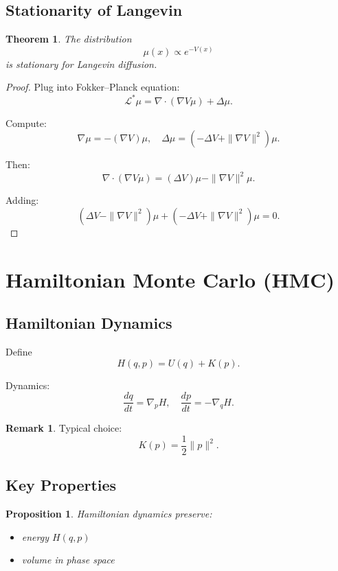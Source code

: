 \documentclass[12pt,oneside]{book}
\numberwithin{equation}{section}
\theoremstyle{definition}
\newtheorem{remark}{Remark}[section]
\theoremstyle{plain}
\newtheorem{theorem}{Theorem}[section]
\newtheorem{proposition}{Proposition}[section]
\theoremstyle{remark}
\begin{document}
\subsection*{Stationarity of Langevin}

\begin{theorem}
The distribution
\[
\mu(x) \propto e^{-V(x)}
\]
is stationary for Langevin diffusion.
\end{theorem}

\begin{proof}
Plug into Fokker--Planck equation:
\[
\mathcal{L}^*\mu
=
\nabla \cdot (\nabla V \mu) + \Delta \mu.
\]

Compute:
\[
\nabla \mu = -(\nabla V)\mu,
\quad
\Delta \mu = (-\Delta V + \|\nabla V\|^2)\mu.
\]

Then:
\[
\nabla \cdot (\nabla V \mu)
=
(\Delta V)\mu - \|\nabla V\|^2 \mu.
\]

Adding:
\[
(\Delta V - \|\nabla V\|^2)\mu + (-\Delta V + \|\nabla V\|^2)\mu = 0.
\]
\end{proof}


\section{Hamiltonian Monte Carlo (HMC)}

\subsection{Hamiltonian Dynamics}

Define
\[
H(q,p) = U(q) + K(p).
\]

Dynamics:
\[
\frac{dq}{dt} = \nabla_p H, \quad
\frac{dp}{dt} = -\nabla_q H.
\]

\begin{remark}
Typical choice:
\[
K(p) = \frac{1}{2}\|p\|^2.
\]
\end{remark}


\subsection{Key Properties}

\begin{proposition}
Hamiltonian dynamics preserve:
\begin{itemize}
\item energy $H(q,p)$
\item volume in phase space
\end{itemize}
\end{proposition}
\end{document}
